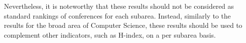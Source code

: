 \documentclass[notitlepage]{svjour3}
\begin{document}
Nevertheless, it is noteworthy that these results should not be considered as standard rankings of conferences for each subarea. Instead, similarly to the results for the broad area of Computer Science, these results should be used to complement other indicators, such as H-index, on a per subarea basis. 

\end{document}
